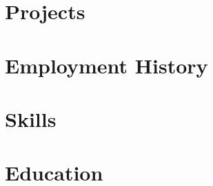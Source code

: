 \documentclass[9pt]{resume}
\begin{document}
\maketitle

\section{Projects}









\section{Employment History}







\section{Skills}











\section{Education}




\end{document}
